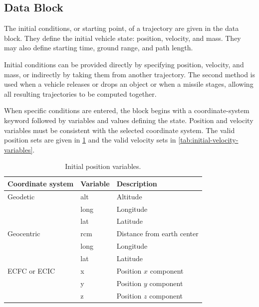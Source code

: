 \subsection{ Data Block}\label{sec:block-initial}

The initial conditions, or starting point, of a trajectory are given in the
 data block. They define the initial vehicle state: position,
velocity, and mass. They may also define starting time, ground range, and path
length.

Initial conditions can be provided directly by specifying position, velocity, and
mass, or indirectly by taking them from another trajectory. The second method is
used when a vehicle releases or drops an object or when a missile stages, allowing
all resulting trajectories to be computed together.


When specific conditions are entered, the block begins with a coordinate-system
keyword followed by variables and values defining the state. Position and velocity
variables must be consistent with the selected coordinate system. The valid position
sets are given in \cref{tab:initial-position-variables} and the valid velocity sets in
\cref{tab:initial-velocity-variables}.

\begin{table}[htbp]
  \centering
  \caption{Initial position variables.}
  \label{tab:initial-position-variables}
  \begin{tabularx}{0.78\linewidth}{@{}l>{\ttfamily}lX@{}}
    \toprule
    Coordinate system & \normalfont Variable & Description \\
    \midrule
    Geodetic & alt  & Altitude \\
             & long & Longitude \\
             & lat  & Latitude \\
    \addlinespace
    Geocentric & rcm  & Distance from earth center \\
               & long & Longitude \\
               & lat  & Latitude \\
    \addlinespace
    ECFC or ECIC & x & Position $x$ component \\
                 & y & Position $y$ component \\
                 & z & Position $z$ component \\
    \bottomrule
  \end{tabularx}
\end{table}

